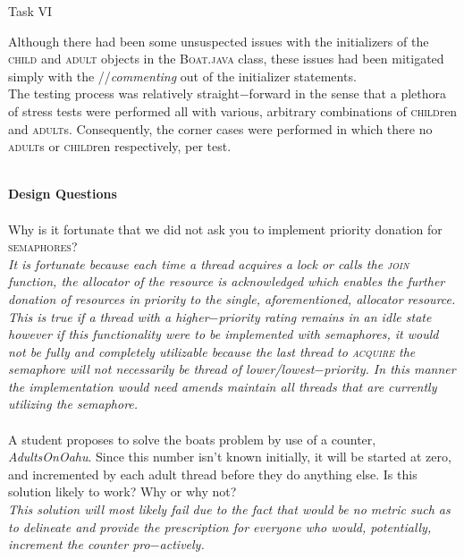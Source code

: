 \documentclass[12pt]{article}
\begin{document}
{\begin{center}Task VI\end{center} 
Although there had been some unsuspected issues with the initializers of the \textsc{child} and \textsc{adult} objects in the \textsc{Boat.java} class, these issues had been mitigated simply with the //\textit{commenting} out of the initializer statements. \\The testing process was relatively straight$-$forward in the sense that a plethora of stress tests were performed all with various, arbitrary combinations of \textsc{child}ren and \textsc{adult}s. Consequently, the corner cases were performed in which there no \textsc{adult}s or \textsc{child}ren respectively, per test.\\\\
}
{\setlength{\parindent}{0cm}
\textbf{Design Questions} \\
\\ Why is it fortunate that we did not ask you to implement priority donation for \textsc{semaphores}?
\\ \textit{It is fortunate because each time a thread acquires a lock or calls the \textsc{join} function, the allocator of the resource is acknowledged which enables the further donation of resources in priority to the single, aforementioned, allocator resource. This is true if a thread with a higher$-$priority rating remains in an idle state however if this functionality were to be implemented with semaphores, it would not be fully and completely utilizable because the last thread to \textsc{acquire} the semaphore will not necessarily be thread of lower/lowest$-$priority. In this manner the implementation would need amends maintain all threads that are currently utilizing the semaphore.} \\\\ A student proposes to solve the boats problem by use of a counter, \textit{AdultsOnOahu}. Since this number isn't known initially, it will be started at zero, and incremented by each adult thread before they do anything else. Is this solution likely to work? Why or why not? \\ \textit{This solution will most likely fail due to the fact that would be no metric such as to delineate and provide the prescription for everyone who would, potentially, increment the counter pro$-$actively.}
\\\\\\\\\\\\\\\\\\\\\\
}
\end{document}
